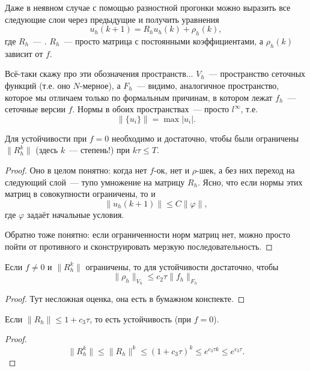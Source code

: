 \documentclass{trlnotes}
\begin{document}
Даже в неявном случае с помощью разностной прогонки можно выразить все следующие слои через предыдущие и получить уравнения
\[
	u_h(k + 1) = R_h u_h(k) + \rho_h(k),
\]
где $R_h$~--- . $R_h$~--- просто матрица с постоянными коэффициентами, а $\rho_h(k)$ зависит от $f$.

\begin{rem}
	Всё-таки скажу про эти обозначения пространств... $V_h$~--- пространство сеточных функций  (т.е. оно $N$-мерное), а $F_h$~--- видимо, аналогичное пространство, которое мы отличаем только по формальным причинам, в котором лежат $f_h$~--- сеточные версии $f$. Нормы в обоих пространствах~--- просто $l^{\infty}$, т.е.
	\[
		\big\|\{u_i\}\big\| = \max |u_i|.
	\]
\end{rem}

\begin{thm} \label{thm:stab-1}
	Для устойчивости при $f = 0$ необходимо и достаточно, чтобы были ограничены $\|R_h^k\|$ (здесь $k$~--- степень!) при $k\tau \leqslant T$.
	\begin{proof}
		Оно в целом понятно: когда нет $f$-ок, нет и $\rho$-шек, а без них переход на следующий слой~--- тупо умножение на матрицу $R_h$. Ясно, что если нормы этих матриц в совокупности ограничены, то и
		\[
			\|u_h(k+1)\| \leqslant C \|\varphi\|,
		\]
		где $\varphi$ задаёт начальные условия.

		Обратно тоже понятно: если ограниченности норм матриц нет, можно просто пойти от противного и сконструировать мерзкую последовательность.
	\end{proof}
\end{thm}

\begin{thm}
	Если $f \neq 0$ и $\|R_h^k\|$ ограничены, то для устойчивости достаточно, чтобы
	\[
		\|\rho_h\|_{V_h} \leqslant c_2 \tau \|f_h\|_{F_h}
	\]
	\begin{proof}
		Тут несложная оценка, она есть в бумажном конспекте. 
	\end{proof}
\end{thm}

\begin{cor}
	Если $\|R_h\| \leqslant 1 + c_3\tau$, то есть устойчивость (при $f = 0$).
	\begin{proof}
		\[
			\|R_h^k\| \leqslant \|R_h\|^k \leqslant (1 + c_3 \tau)^k \leqslant e^{c_3 \tau k} \leqslant e^{c_3 \tau}.
		\]
	\end{proof}
\end{cor}
\end{document}
